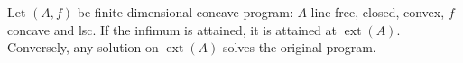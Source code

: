 Let $(A,f)$ be finite dimensional concave program: $A$ line-free, closed, convex, $f$ concave and lsc. If the infimum is attained, it is attained at $\operatorname{ext}(A)$. Conversely, any solution on $\operatorname{ext}(A)$ solves the original program.
